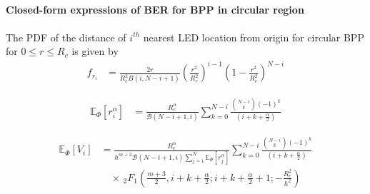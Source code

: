 \documentclass{beamer}
\providecommand{\sbrak}[1]{\ensuremath{{}\left[#1\right]}}
\providecommand{\brak}[1]{\ensuremath{\left(#1\right)}}
\theoremstyle{remark}
\begin{document}
\begin{frame}
\frametitle{\,}
\framesubtitle{Closed-form expressions of BER for BPP in circular region}
\begin{list}{}{}
\vfill
\item<1->
The PDF of the distance of $i^{th}$ nearest LED location from origin for circular BPP for $0 \leq r \leq R_c$ is given by %
\begin{align}
f_{r_i}	&=
\frac{2r}{R_c^2 B\brak{i,N-i+1}}\brak{\frac{r^2}{R_c^2}}^{i-1}\brak{1-\frac{r^2}{R_c^2}}^{N-i}
\nonumber 
   \end{align}
   \vfill
   \item<2->
   \begin{align}
   \mathbb{E}_{\Phi}\sbrak{r_i^{\alpha}} & =\frac{R_c^{\alpha}}{\mathcal{B}\brak{N-i+1,i}}\sum_{k=0}^{N-i}\frac{\binom{N-i}{k}\brak{-1}^{k}}{\brak{i+k+\frac{\alpha}{2}}}  \nonumber
      \end{align}
      
      \vfill
\item<3>
      \begin{align}
   \mathbb{E}_{\Phi}\sbrak{V_i}
     &=\frac{R_c^{\alpha}}{h^{m+3}\mathcal{B}\brak{N-i+1,i}\sum_{j=1}^N\mathbb{E}_{\Phi}\sbrak{r_j^{\alpha}}} \sum_{k=0}^{N-i}\frac{\binom{N-i}{k}(-1)^{k}}{\brak{i+k+\frac{\alpha}{2}}} \nonumber\\
    & \quad \times  \, _2F_1\brak{\frac{m+3}{2},i+k+\frac{\alpha}{2};i+k+\frac{\alpha}{2}+1;-\frac{R_c^2}{h^2}} \nonumber
   \end{align}
   \vfill
   \end{list}
\end{frame}
\end{document}
